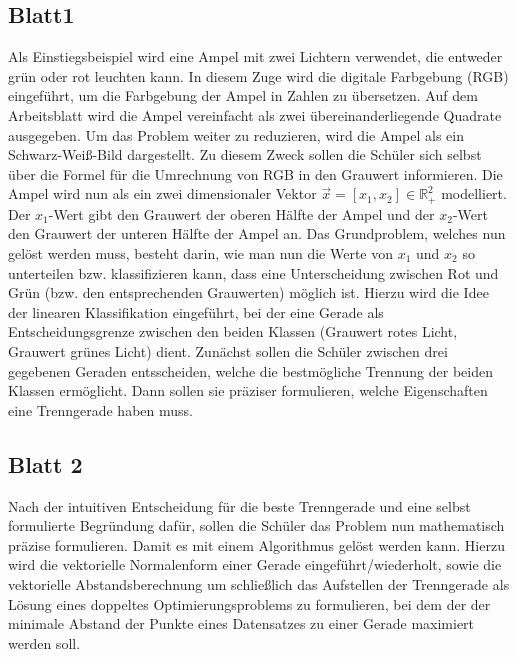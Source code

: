         \subsection{Blatt1}
            Als Einstiegsbeispiel wird eine Ampel mit zwei Lichtern verwendet, die entweder grün oder rot leuchten kann. In diesem Zuge wird die digitale Farbgebung (RGB) eingeführt, um die Farbgebung der Ampel in Zahlen zu übersetzen. Auf dem Arbeitsblatt wird die Ampel vereinfacht als zwei übereinanderliegende Quadrate ausgegeben.
            Um das Problem weiter zu reduzieren, wird die Ampel  als ein Schwarz-Weiß-Bild dargestellt. Zu diesem Zweck sollen die Schüler sich selbst über die Formel für die Umrechnung von RGB in den Grauwert informieren. Die Ampel wird nun als ein zwei dimensionaler Vektor $\vec{x}=[x_1, x_2] \in \mathbb{R}_+^2$ modelliert.
            Der $x_1$-Wert gibt den Grauwert der oberen Hälfte der Ampel und der $x_2$-Wert den Grauwert der unteren Hälfte der Ampel an.
            Das Grundproblem, welches nun gelöst werden muss, besteht darin, wie man nun die Werte von $x_1$ und $x_2$ so unterteilen bzw. klassifizieren kann, dass eine Unterscheidung zwischen Rot und Grün (bzw. den entsprechenden Grauwerten) möglich ist.
            Hierzu wird die Idee der linearen Klassifikation eingeführt, bei der eine Gerade als Entscheidungsgrenze zwischen den beiden Klassen (Grauwert rotes Licht, Grauwert grünes Licht) dient.
            Zunächst sollen die Schüler zwischen drei gegebenen Geraden entsscheiden, welche die bestmögliche Trennung der beiden Klassen ermöglicht. Dann sollen sie präziser formulieren, welche Eigenschaften eine Trenngerade haben muss.
        \subsection{Blatt 2}
            Nach der intuitiven Entscheidung für die beste Trenngerade und eine selbst formulierte Begründung dafür, sollen die Schüler das Problem nun mathematisch präzise formulieren. Damit es mit einem Algorithmus gelöst werden kann.
            Hierzu wird die vektorielle Normalenform einer Gerade eingeführt/wiederholt, sowie die vektorielle Abstandsberechnung um schließlich das Aufstellen der Trenngerade als Lösung eines doppeltes Optimierungsproblems zu formulieren, bei dem der der minimale Abstand der Punkte eines Datensatzes zu einer Gerade maximiert werden soll.
